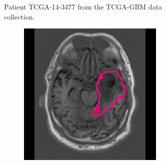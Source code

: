 \begin{subappendices}
\begin{figure}[htbp]
\begin{subfigure}[b]{0.95\textwidth}
\begin{subfigure}[b]{0.215\textwidth}
        \end{subfigure}
        \caption{Patient TCGA-14-3477 from the TCGA-GBM data collection.}\label{fig:hgg_example_tcga143477}
    \end{subfigure}
    \begin{subfigure}[b]{0.95\textwidth}
        \centering
        \hfill
        \begin{subfigure}[b]{0.215\textwidth}
        \includegraphics[width=\textwidth, clip, trim=2.5cm 0.5cm 2.5cm 0.5cm]{Figures/Random_segs/T1_TCGA-19-5951.png}
        \end{subfigure}
        \hfill
        \begin{subfigure}[b]{0.215\textwidth}

\end{subfigure}
\end{subfigure}
\end{figure}
\end{subappendices}
